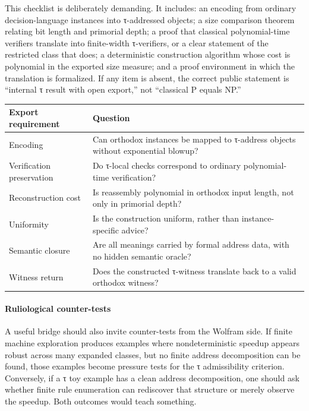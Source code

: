 \documentclass{pantarhei-researchnote}
\begin{document}
This checklist is deliberately demanding. It includes: an encoding
from ordinary decision-language instances into τ-addressed objects; a
size comparison theorem relating bit length and primorial depth; a proof
that classical polynomial-time verifiers translate into finite-width
τ-verifiers, or a clear statement of the restricted class that does; a
deterministic construction algorithm whose cost is polynomial in the
exported size measure; and a proof environment in which the translation
is formalized. If any item is absent, the correct public statement is
``internal τ result with open export,'' not ``classical P equals NP.''

\begin{center}
\begin{minipage}{\columnwidth}
\label{tab:export-checklist}
\prtablefont
\begin{tabularx}{\columnwidth}{p{}Y}
\toprule
\textbf{Export requirement} & \textbf{Question} \\
\midrule
Encoding & Can orthodox instances be mapped to τ-address objects without
exponential blowup? \\
Verification preservation & Do τ-local checks correspond to ordinary
polynomial-time verification? \\
Reconstruction cost & Is reassembly polynomial in orthodox input length,
not only in primorial depth? \\
Uniformity & Is the construction uniform, rather than instance-specific
advice? \\
Semantic closure & Are all meanings carried by formal address data, with
no hidden semantic oracle? \\
Witness return & Does the constructed τ-witness translate back to a valid
orthodox witness? \\
\bottomrule
\end{tabularx}
\end{minipage}
\end{center}

\paragraph{Ruliological counter-tests}
A useful bridge should also invite counter-tests from the Wolfram side.
If finite machine exploration produces examples where nondeterministic
speedup appears robust across many expanded classes, but no finite
address decomposition can be found, those examples become pressure tests
for the τ admissibility criterion. Conversely, if a τ toy example has a
clean address decomposition, one should ask whether finite rule
enumeration can rediscover that structure or merely observe the speedup.
Both outcomes would teach something.
\end{document}
